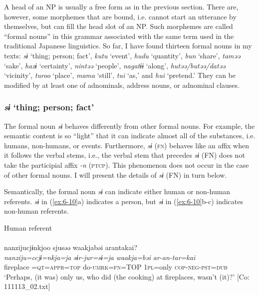 A head of an NP is usually a free form as in the previous section. There are, however, some morphemes that are bound, i.e. cannot start an utterance by themselves, but can fill the head slot of an NP. Such morphemes are called “formal nouns” in this grammar associated with the same term used in the traditional Japanese linguistics. So far, I have found thirteen formal nouns in my texts: \textit{sɨ} ‘thing; person; fact’, \textit{kutu} ‘event’, \textit{hudu} ‘quantity’, \textit{bun} ‘share’, \textit{taməə} ‘sake’, \textit{hazɨ} ‘certainty’, \textit{nintəə} ‘people’, \textit{nagatɨɨ} ‘along’, \textit{hutəə/butəə/datəə} ‘vicinity’, \textit{turoo} ‘place’, \textit{mama} ‘still’, \textit{tui} ‘as,’ and \textit{hui} ‘pretend.’ They can be modified by at least one of adnominals, address nouns, or adnominal clauses.

\subsubsection{\textit{sɨ} ‘thing; person; fact’}

The formal noun \textit{sɨ} behaves differently from other formal nouns. For example, the semantic content is so “light” that it can indicate almost all of the substances, i.e. humans, non-humans, or events. Furthermore, \textit{sɨ} (\textsc{fn}) behaves like an affix when it follows the verbal stems, i.e., the verbal stem that precedes \textit{sɨ} (FN) does not take the participial affix \textit{-n} (\textsc{ptcp}). This phenomenon does not occur in the case of other formal nouns. I will present the details of \textit{sɨ} (FN) in turn below.

Semantically, the formal noun \textit{sɨ} can indicate either human or non-human referents. \textit{sɨ} in (\ref{ex:6-10}a) indicates a person, but \textit{sɨ} in (\ref{ex:6-10}b-c) indicates non-human referents.

\ea\label{ex:6-10}
 Human referent\\

 \ea{}\\
{\TM}
\glll nanzijucjɨnkjoo  sjusəə  waakjabəi  arantakai?\\
\textit{nanziju=ccjɨ=nkja=ja}  \textit{sɨr-jur=sɨ=ja}  \textit{waakja=bəi}   \textit{ar-an-tar=kai}\\
fireplace =\textsc{qt}=\textsc{appr}=\textsc{top}  do-\textsc{umrk}=\textsc{fn}=TOP  1\textsc{pl}=only     \textsc{cop}-\textsc{neg}-\textsc{pst}=\textsc{dub}\\
\glt ‘Perhaps, (it was) only us, who did (the cooking) at fireplaces, wasn’t (it)?’ [Co: 111113\_02.txt]
\z

